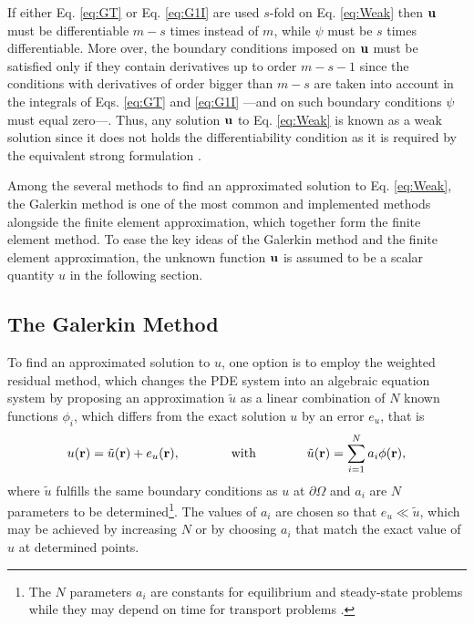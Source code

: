 %
If either Eq. \eqref{eq:GT} or Eq. \eqref{eq:G1I} are used $s$-fold on Eq. \eqref{eq:Weak} then $\vb{u}$ must be differentiable $m-s$ times instead of $m$, while $\psi$ must be $s$ times differentiable. More over, the boundary conditions imposed on $\vb{u}$ must be satisfied only if they contain  derivatives up to order $m-s-1$ since the conditions with derivatives of order bigger than $m-s$ are taken into account in the integrals of Eqs. \eqref{eq:GT} and \eqref{eq:G1I} ---and on such boundary conditions $\psi$ must equal zero---. Thus, any solution $\vb{u}$ to Eq. \eqref{eq:Weak} is known as a weak solution  since it does not holds the differentiability condition as it is required by the equivalent strong formulation \cite{dhatt_finite_2012}.

Among the several methods to find an approximated solution to Eq. \eqref{eq:Weak}, the Galerkin method is one of the most common and implemented methods alongside the finite element approximation, which together form the finite element method. To ease the key ideas of the Galerkin method and the finite element approximation, the unknown function $\vb{u}$ is assumed to be a scalar quantity $u$ in the following section.

    \subsection{The Galerkin Method}

    To find an approximated solution to $u$, one option is to employ the weighted residual method, which changes the PDE system into an algebraic equation system by proposing an approximation  $\tilde{u}$ as a linear combination of $N$ known functions  $\phi_i$, which differs from the exact solution $u$ by an error $e_{u}$, that is \cite{dhatt_finite_2012,larson_finite_2013,fletcher_computational_1984}
     \begin{align}
        {u}(\vb{r}) = \tilde{{u}}(\vb{r}) + e_{{u}}(\vb{r}),
            \qquad\qquad
            \text{with}
            \qquad\qquad
        \tilde{{u}}(\vb{r}) = \sum_{i = 1}^{N} {a}_i\phi(\vb{r}),
     \label{eq:uapprox}
     \end{align}
     where $\tilde{{u}}$ fulfills the same boundary conditions as ${u}$ at $\partial\Omega$ and ${a}_i$ are $N$ parameters to be determined\footnote{The $N$ parameters ${a}_i$ are constants for equilibrium and steady-state problems while they may depend on time for transport problems \cite{dhatt_finite_2012}.}. The values of ${a}_i$ are chosen so that $e_{{u}}\ll  \tilde{u} $, which may be achieved by increasing $N$ or by choosing ${a}_i$ that match the exact value of ${u}$ at determined points.

